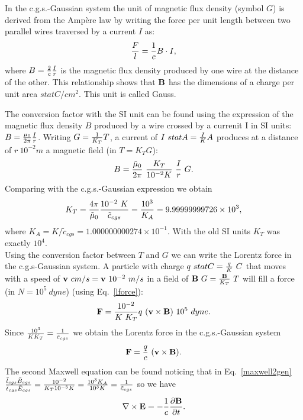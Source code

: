 \documentclass[12pt,a4paper]{article}
\def\kappaa{1.000000000274\times 10^{-1}}
\def\toverg{9.99999999726\times 10^{3}}
\begin{document}
{\color{orange} In the c.g.s.-Gaussian system the unit of magnetic
flux density (symbol $G$) is derived from the Amp\`ere law by writing 
the force per unit length between two parallel wires traversed by 
a current $I$ as:
\begin{equation}
{F \over l} = {1\over c} B \cdot I,
\end{equation}
where $B={2\over c} {I \over r}$ is the magnetic flux density produced by 
one wire at the distance of the other. 
This relationship shows that ${\bf B}$ has the dimensions of a
charge per unit area $statC/cm^2$. This unit is called Gauss.

The conversion factor with the SI unit can be found using the expression of 
the magnetic flux density $B$ produced by a wire crossed by 
a currenit I in SI units: $B={\mu_0\over 2 \pi} {I \over r}$. 
Writing $G={1\over K_T} T$, a current of $I\ statA= {I\over K} 
A$ produces at a distance of $r\ {10^{-2}} m$ a magnetic field 
(in $T=K_T G$): 
\begin{equation}
B={\tilde \mu_0\over 2 \pi}\ {K_T \over
10^{-2} K}\ {I\over r}\  G.
\end{equation}
Comparing with the c.g.s.-Gaussian expression we obtain
\begin{equation}
K_T= {4 \pi \over \tilde \mu_0} {10^{-2}\ K \over \tilde c_{cgs}}= 
{10^3 \over K_A}=\toverg,
\end{equation}
where $K_A=K/\tilde c_{cgs}=\kappaa$. 
With the old SI units $K_T$ was exactly $10^4$.
\\
Using the conversion factor between $T$ and $G$ we can write the 
Lorentz force in the c.g.s-Gaussian system. A particle with charge
$q\ statC={q\over K}\ C$ that moves with a speed of ${\bf v}\ cm/s=
{\bf v}\ 10^{-2}\ m/s$ in a field of ${\bf B}\ G = {{\bf B} \over K_T}\ T$ 
will fill a force (in $N=10^5\ dyne$) (using Eq.~\ref{lforce}):
\begin{equation}
{\bf F}={10^{-2} \over K\ K_T} q\ ({\bf v}\times {\bf B})\ 10^5\ dyne. 
\end{equation}
Since ${10^{3} \over K K_T}=
{1\over \tilde c_{cgs}}$ we obtain the Lorentz force in the 
c.g.s.-Gaussian system
\begin{equation}
{\bf F}={q\over c}\ ({\bf v}\times {\bf B}).
\end{equation}
The second Maxwell equation can be found noticing that in Eq.~\ref{maxwell2gen}
${\bar l_{cgs} \bar B_{cgs} \over \bar t_{cgs} \bar E_{cgs}}=
{10^{-2} \over K_T 10^{-5} K}={10^3 K_A \over 10^3 K}={1\over 
\tilde c_{cgs}}$ so 
we have
\begin{equation}
\nabla \times {\bf E}=-{1\over c}
{\partial {\bf B} \over \partial t}.
\label{maxwell2cgs}
\end{equation}
}
\\
\end{document}
